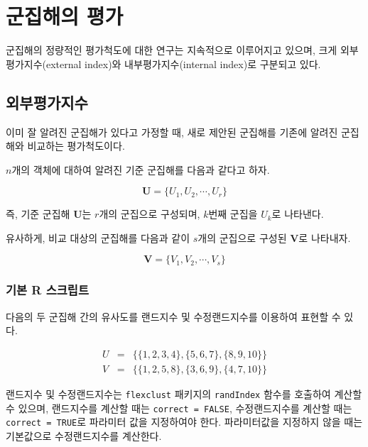 \documentclass[]{book}
\begin{document}
\hypertarget{cluster-solution-evaluation-metric}{%
\section{군집해의 평가}\label{cluster-solution-evaluation-metric}}

군집해의 정량적인 평가척도에 대한 연구는 지속적으로 이루어지고 있으며, 크게 외부평가지수(external index)와 내부평가지수(internal index)로 구분되고 있다.

\hypertarget{cluster-evaluation-external-index}{%
\subsection{외부평가지수}\label{cluster-evaluation-external-index}}

이미 잘 알려진 군집해가 있다고 가정할 때, 새로 제안된 군집해를 기존에 알려진 군집해와 비교하는 평가척도이다.

\(n\)개의 객체에 대하여 알려진 기준 군집해를 다음과 같다고 하자.

\begin{equation*}
\mathbf{U} = \{ U_1, U_2, \cdots, U_r \}
\end{equation*}

즉, 기준 군집해 \(\mathbf{U}\)는 \(r\)개의 군집으로 구성되며, \(k\)번째 군집을 \(U_k\)로 나타낸다.

유사하게, 비교 대상의 군집해를 다음과 같이 \(s\)개의 군집으로 구성된 \(\mathbf{V}\)로 나타내자.

\begin{equation*}
\mathbf{V} = \{ V_1, V_2, \cdots, V_s \}
\end{equation*}

\hypertarget{cluster-external-index-basic-script}{%
\subsubsection{기본 R 스크립트}\label{cluster-external-index-basic-script}}

다음의 두 군집해 간의 유사도를 랜드지수 및 수정랜드지수를 이용하여 표현할 수 있다.

\begin{eqnarray*}
U &=& \{ \{1, 2, 3, 4\}, \{5, 6, 7\}, \{8, 9, 10\} \}\\
V &=& \{ \{1, 2, 5, 8\}, \{3, 6, 9\}, \{4, 7, 10\} \}
\end{eqnarray*}

랜드지수 및 수정랜드지수는 \texttt{flexclust} 패키지의 \texttt{randIndex} 함수를 호출하여 계산할 수 있으며, 랜드지수를 계산할 때는 \texttt{correct\ =\ FALSE}, 수정랜드지수를 계산할 때는 \texttt{correct\ =\ TRUE}로 파라미터 값을 지정하여야 한다. 파라미터값을 지정하지 않을 때는 기본값으로 수정랜드지수를 계산한다.
\end{document}
